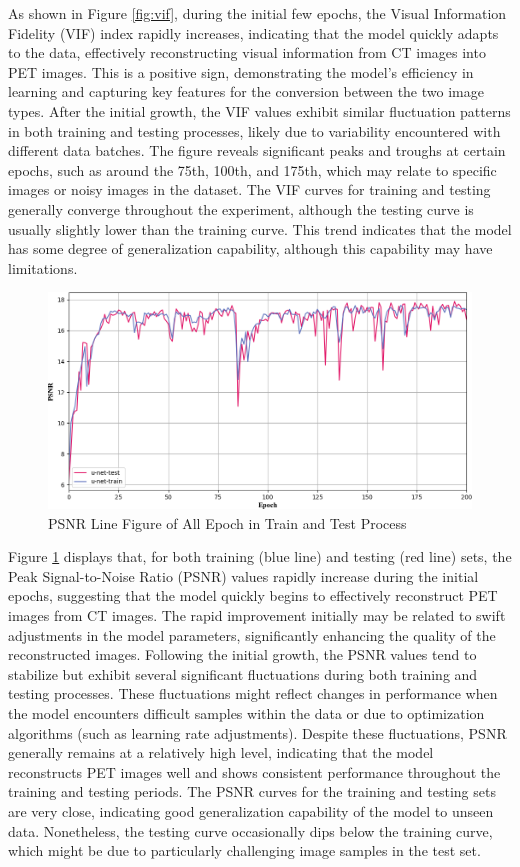 \documentclass[twocolumn]{article}
\begin{document}
As shown in Figure \ref{fig:vif}, during the initial few epochs, the Visual Information Fidelity (VIF) index rapidly increases, indicating that the model quickly adapts to the data, effectively reconstructing visual information from CT images into PET images. This is a positive sign, demonstrating the model's efficiency in learning and capturing key features for the conversion between the two image types. After the initial growth, the VIF values exhibit similar fluctuation patterns in both training and testing processes, likely due to variability encountered with different data batches. The figure reveals significant peaks and troughs at certain epochs, such as around the 75th, 100th, and 175th, which may relate to specific images or noisy images in the dataset. The VIF curves for training and testing generally converge throughout the experiment, although the testing curve is usually slightly lower than the training curve. This trend indicates that the model has some degree of generalization capability, although this capability may have limitations.

\begin{figure}[h]
	\centering
	\includegraphics[width=1.0\linewidth]{u-net/PSNR}
	\caption[psnr]{PSNR Line Figure of All Epoch in Train and Test Process}
	\label{fig:psnr}
\end{figure}

Figure \ref{fig:psnr} displays that, for both training (blue line) and testing (red line) sets, the Peak Signal-to-Noise Ratio (PSNR) values rapidly increase during the initial epochs, suggesting that the model quickly begins to effectively reconstruct PET images from CT images. The rapid improvement initially may be related to swift adjustments in the model parameters, significantly enhancing the quality of the reconstructed images. Following the initial growth, the PSNR values tend to stabilize but exhibit several significant fluctuations during both training and testing processes. These fluctuations might reflect changes in performance when the model encounters difficult samples within the data or due to optimization algorithms (such as learning rate adjustments). Despite these fluctuations, PSNR generally remains at a relatively high level, indicating that the model reconstructs PET images well and shows consistent performance throughout the training and testing periods. The PSNR curves for the training and testing sets are very close, indicating good generalization capability of the model to unseen data. Nonetheless, the testing curve occasionally dips below the training curve, which might be due to particularly challenging image samples in the test set.
\end{document}
